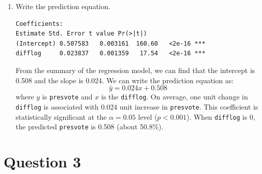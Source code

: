 \documentclass[12pt,letterpaper]{article}
\begin{document}
\begin{enumerate}
		\item Write the prediction equation.\\
			\begin{doublespace}
			\begin{footnotesize}
			\begin{verbatim}
Coefficients:
Estimate Std. Error t value Pr(>|t|)    
(Intercept) 0.507583   0.003161  160.60   <2e-16 ***
difflog     0.023837   0.001359   17.54   <2e-16 ***
				\end{verbatim}
			\end{footnotesize}
			From the summary of the regression model, we can find that the intercept is 0.508 and the slope is 0.024. We can write the prediction equation as:
			$$\hat{y} = 0.024x + 0.508$$
			where $y$ is \texttt{presvote} and $x$ is the \texttt{difflog}. On average, one unit change in \texttt{difflog} is associated with 0.024 unit increase in \texttt{presvote}. This coefficient is statistically significant at the $\alpha = 0.05$ level ($p < 0.001$). When \texttt{difflog} is 0, the predicted \texttt{presvote} is 0.508 (about 50.8\%).
		\end{doublespace}
	\end{enumerate}
	
	\newpage	
\section*{Question 3}
\end{document}
